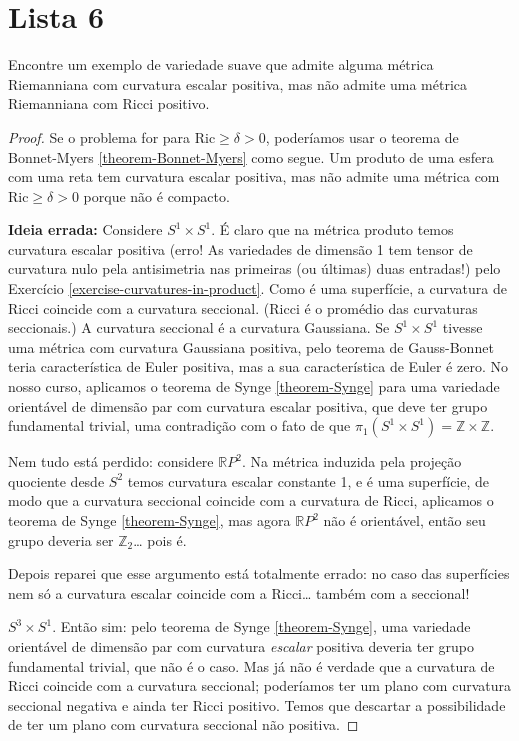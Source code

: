 \section{Lista 6}
\label{section-lista-6}

\begin{exercise}
\label{exercise-posit-scala-but-no-posit-duplicate-2}
Encontre um exemplo de variedade suave que
admite alguma métrica Riemanniana com
curvatura escalar positiva, mas não admite
uma métrica Riemanniana com Ricci
positivo.
\end{exercise}

\begin{proof}
Se o problema for para $\text{Ric}\geq
\delta>0$, poderíamos usar o teorema de
Bonnet-Myers \ref{theorem-Bonnet-Myers} como
segue. Um produto de uma esfera com
uma reta tem curvatura escalar positiva, mas
não admite uma métrica com
$\text{Ric}\geq\delta>0$ porque não é
compacto.

{\bf Ideia errada:} Considere $S^1\times
S^1$. É claro que na métrica produto
temos curvatura escalar positiva (erro! As
variedades de dimensão 1 tem tensor
de curvatura nulo pela antisimetria nas
primeiras (ou últimas) duas entradas!)
pelo Exercício
\ref{exercise-curvatures-in-product}. Como é
uma superfície, a
curvatura de Ricci coincide com a curvatura
seccional. (Ricci é o promédio das
curvaturas seccionais.) A curvatura seccional
é a curvatura Gaussiana. Se
$S^1\times S^1$ tivesse uma métrica com
curvatura Gaussiana positiva, pelo
teorema de Gauss-Bonnet teria característica
de Euler positiva, mas a sua
característica de Euler é zero. No nosso
curso, aplicamos o teorema de Synge
\ref{theorem-Synge} para uma variedade
orientável de dimensão par com curvatura
escalar positiva, que deve ter grupo
fundamental trivial, uma contradição com o
fato de que $\pi_{1}(S^1\times
S^1)=\mathbb{Z}\times\mathbb{Z}$.

Nem tudo está perdido: considere
$\mathbb{R}P^{2}$. Na métrica induzida pela
projeção quociente desde $S^2$ temos
curvatura escalar constante 1, e é uma
superfície, de modo que a curvatura seccional
coincide com a curvatura de Ricci,
aplicamos o teorema de Synge
\ref{theorem-Synge}, mas agora
$\mathbb{R}P^{2}$
não é orientável, então seu grupo deveria ser
$\mathbb{Z}_2$… pois é.

Depois reparei que esse argumento está
totalmente errado: no caso das
superfícies nem só a curvatura escalar
coincide com a Ricci… também com a
seccional!

 $S^3\times S^1$. Então sim: pelo teorema de
Synge \ref{theorem-Synge}, uma variedade
orientável de dimensão par com
curvatura {\it escalar} positiva deveria ter
grupo fundamental trivial, que não
é o caso. Mas já não é verdade que a
curvatura de Ricci coincide com a curvatura
 seccional; poderíamos ter um plano com
 curvatura seccional negativa e ainda ter
Ricci positivo. Temos que descartar a
possibilidade de ter um plano com
curvatura seccional não positiva.
\end{proof}


